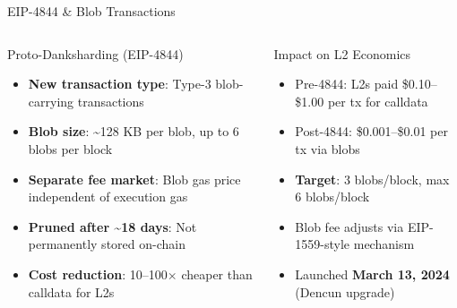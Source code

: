 \documentclass[8pt,aspectratio=169]{beamer}
\begin{document}
\begin{frame}{EIP-4844 \& Blob Transactions}
\vspace{-1mm}
\begin{columns}[T]
\begin{block}{Proto-Danksharding (EIP-4844)}
\footnotesize
\begin{itemize}\setlength\itemsep{3pt}
  \item \textbf{New transaction type}: Type-3 blob-carrying transactions
  \item \textbf{Blob size}: \textasciitilde128 KB per blob, up to 6 blobs per block
  \item \textbf{Separate fee market}: Blob gas price independent of execution gas
  \item \textbf{Pruned after \textasciitilde18 days}: Not permanently stored on-chain
  \item \textbf{Cost reduction}: 10--100$\times$ cheaper than calldata for L2s
\end{itemize}
\end{block}
\vspace{2mm}
\begin{block}{Impact on L2 Economics}
\footnotesize
\begin{itemize}
  \item Pre-4844: L2s paid \$0.10--\$1.00 per tx for calldata
  \item Post-4844: \$0.001--\$0.01 per tx via blobs
  \item \textbf{Target}: 3 blobs/block, max 6 blobs/block
  \item Blob fee adjusts via EIP-1559-style mechanism
  \item Launched \textbf{March 13, 2024} (Dencun upgrade)
\end{itemize}
\end{block}
\vspace{1mm}
\end{columns}
\end{frame}
\end{document}
